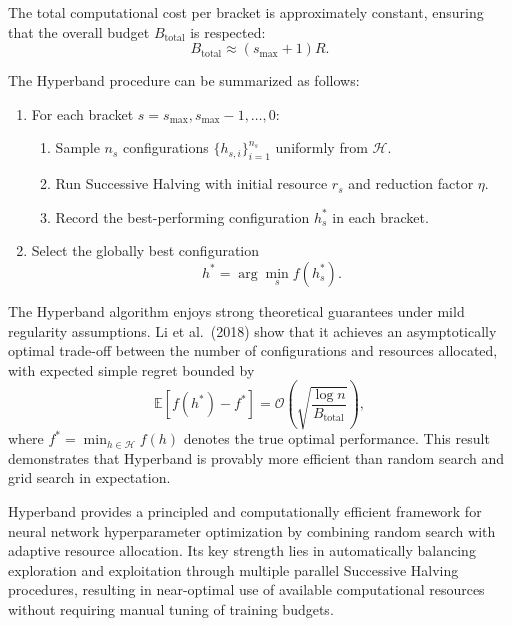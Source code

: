 The total computational cost per bracket is approximately constant, ensuring that the overall budget $B_{\text{total}}$ is respected:
\begin{equation}
    B_{\text{total}} \approx (s_{\max} + 1) R.
\end{equation}

The Hyperband procedure can be summarized as follows:
\begin{enumerate}
    \item For each bracket $s = s_{\max}, s_{\max}-1, \ldots, 0$:
    \begin{enumerate}
        \item Sample $n_s$ configurations $\{h_{s,i}\}_{i=1}^{n_s}$ uniformly from $\mathcal{H}$.
        \item Run Successive Halving with initial resource $r_s$ and reduction factor $\eta$.
        \item Record the best-performing configuration $h_s^*$ in each bracket.
    \end{enumerate}
    \item Select the globally best configuration
    \begin{equation}
        h^* = \arg\min_{s} f(h_s^*).
    \end{equation}
\end{enumerate}

The Hyperband algorithm enjoys strong theoretical guarantees under mild regularity assumptions. Li et al.\ (2018) show that it achieves an asymptotically optimal trade-off between the number of configurations and resources allocated, with expected simple regret bounded by
\begin{equation}
    \mathbb{E}\left[f(h^*) - f^*\right] = \mathcal{O}\left(\sqrt{\frac{\log n}{B_{\text{total}}}}\right),
    \label{eq:hyperband_regret}
\end{equation}
where $f^* = \min_{h \in \mathcal{H}} f(h)$ denotes the true optimal performance. This result demonstrates that Hyperband is provably more efficient than random search and grid search in expectation.

Hyperband provides a principled and computationally efficient framework for neural network hyperparameter optimization by combining random search with adaptive resource allocation. Its key strength lies in automatically balancing exploration and exploitation through multiple parallel Successive Halving procedures, resulting in near-optimal use of available computational resources without requiring manual tuning of training budgets.


